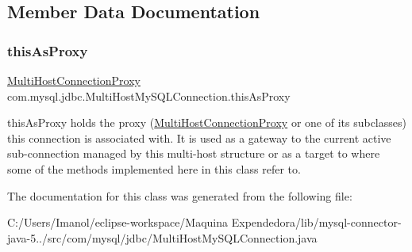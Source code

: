 \subsection{Member Data Documentation}
\mbox{\label{classcom_1_1mysql_1_1jdbc_1_1_multi_host_my_s_q_l_connection_ae5289eb21fb13d6c9c5aa62258339517}} 
\subsubsection{\texorpdfstring{this\+As\+Proxy}{thisAsProxy}}
{\footnotesize\ttfamily \mbox{\hyperlink{classcom_1_1mysql_1_1jdbc_1_1_multi_host_connection_proxy}{Multi\+Host\+Connection\+Proxy}} com.\+mysql.\+jdbc.\+Multi\+Host\+My\+S\+Q\+L\+Connection.\+this\+As\+Proxy\hspace{0.3cm}{\ttfamily [protected]}}

this\+As\+Proxy holds the proxy (\mbox{\hyperlink{classcom_1_1mysql_1_1jdbc_1_1_multi_host_connection_proxy}{Multi\+Host\+Connection\+Proxy}} or one of its subclasses) this connection is associated with. It is used as a gateway to the current active sub-\/connection managed by this multi-\/host structure or as a target to where some of the methods implemented here in this class refer to. 

The documentation for this class was generated from the following file\+:\begin{DoxyCompactItemize}
\item 
C\+:/\+Users/\+Imanol/eclipse-\/workspace/\+Maquina Expendedora/lib/mysql-\/connector-\/java-\/5../src/com/mysql/jdbc/Multi\+Host\+My\+S\+Q\+L\+Connection.\+java\end{DoxyCompactItemize}
